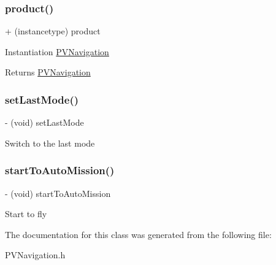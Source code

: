 \subsubsection{\texorpdfstring{product()}{product()}}
{\footnotesize\ttfamily + (instancetype) product \begin{DoxyParamCaption}{ }\end{DoxyParamCaption}}

Instantiation \hyperlink{interface_p_v_navigation}{P\+V\+Navigation}

\begin{DoxyReturn}{Returns}
\hyperlink{interface_p_v_navigation}{P\+V\+Navigation} 
\end{DoxyReturn}
\mbox{\label{interface_p_v_navigation_a4b32f3fa3ac406334f043450ee2b04d1}} 
\subsubsection{\texorpdfstring{set\+Last\+Mode()}{setLastMode()}}
{\footnotesize\ttfamily -\/ (void) set\+Last\+Mode \begin{DoxyParamCaption}{ }\end{DoxyParamCaption}}

Switch to the last mode \mbox{\label{interface_p_v_navigation_abc96a899a090af309b1a9cfa529068f7}} 
\subsubsection{\texorpdfstring{start\+To\+Auto\+Mission()}{startToAutoMission()}}
{\footnotesize\ttfamily -\/ (void) start\+To\+Auto\+Mission \begin{DoxyParamCaption}{ }\end{DoxyParamCaption}}

Start to fly 

The documentation for this class was generated from the following file\+:\begin{DoxyCompactItemize}
\item 
P\+V\+Navigation.\+h\end{DoxyCompactItemize}
